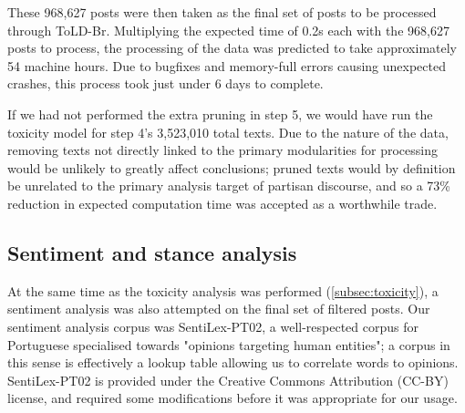 \documentclass[a4paper,11pt]{article}  %
\begin{document}
	These 968,627 posts were then taken as the final set of posts to be processed through ToLD-Br. Multiplying the expected time of 0.2s each with the 968,627 posts to process, the processing of the data was predicted to take approximately 54 machine hours. Due to bugfixes and memory-full errors causing unexpected crashes, this process took just under 6 days to complete.
	
	If we had not performed the extra pruning in step 5, we would have run the toxicity model for step 4's 3,523,010 total texts. Due to the nature of the data, removing texts not directly linked to the primary modularities for processing would be unlikely to greatly affect conclusions; pruned texts would by definition be unrelated to the primary analysis target of partisan discourse, and so a 73\% reduction in expected computation time was accepted as a worthwhile trade.

	\subsection{Sentiment and stance analysis}
	\label{subsec:sentiment}
	At the same time as the toxicity analysis was performed (\autoref{subsec:toxicity}), a sentiment analysis was also attempted on the final set of filtered posts. Our sentiment analysis corpus was SentiLex-PT02, a well-respected corpus for Portuguese specialised towards "opinions targeting human entities"\parencite{carvalhoSentiLexPT021970}; a corpus in this sense is effectively a lookup table allowing us to correlate words to opinions. SentiLex-PT02 is provided under the Creative Commons Attribution (CC-BY) license, and required some modifications before it was appropriate for our usage.
\end{document}
